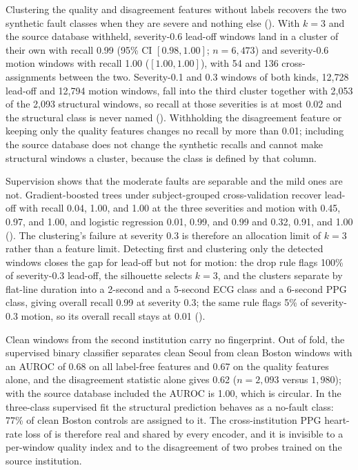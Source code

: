 \documentclass[pmlr,twocolumn,10pt]{jmlr}
\begin{document}
Clustering the quality and disagreement features without labels recovers the two synthetic fault classes when they are severe and nothing else (). With $k=3$ and the source database withheld, severity-0.6 lead-off windows land in a cluster of their own with recall 0.99 (95\% CI $[0.98,1.00]$; $n=6{,}473$) and severity-0.6 motion windows with recall 1.00 ($[1.00,1.00]$), with 54 and 136 cross-assignments between the two. Severity-0.1 and 0.3 windows of both kinds, 12,728 lead-off and 12,794 motion windows, fall into the third cluster together with 2,053 of the 2,093 structural windows, so recall at those severities is at most 0.02 and the structural class is never named (). Withholding the disagreement feature or keeping only the quality features changes no recall by more than 0.01; including the source database does not change the synthetic recalls and cannot make structural windows a cluster, because the class is defined by that column.

Supervision shows that the moderate faults are separable and the mild ones are not. Gradient-boosted trees under subject-grouped cross-validation recover lead-off with recall 0.04, 1.00, and 1.00 at the three severities and motion with 0.45, 0.97, and 1.00, and logistic regression 0.01, 0.99, and 0.99 and 0.32, 0.91, and 1.00 (). The clustering's failure at severity 0.3 is therefore an allocation limit of $k=3$ rather than a feature limit. Detecting first and clustering only the detected windows closes the gap for lead-off but not for motion: the drop rule flags 100\% of severity-0.3 lead-off, the silhouette selects $k=3$, and the clusters separate by flat-line duration into a 2-second and a 5-second ECG class and a 6-second PPG class, giving overall recall 0.99 at severity 0.3; the same rule flags 5\% of severity-0.3 motion, so its overall recall stays at 0.01 ().

Clean windows from the second institution carry no fingerprint. Out of fold, the supervised binary classifier separates clean Seoul from clean Boston windows with an AUROC of 0.68 on all label-free features and 0.67 on the quality features alone, and the disagreement statistic alone gives 0.62 ($n=2{,}093$ versus $1{,}980$); with the source database included the AUROC is 1.00, which is circular. In the three-class supervised fit the structural prediction behaves as a no-fault class: 77\% of clean Boston controls are assigned to it. The cross-institution PPG heart-rate loss of  is therefore real and shared by every encoder, and it is invisible to a per-window quality index and to the disagreement of two probes trained on the source institution.
\end{document}
